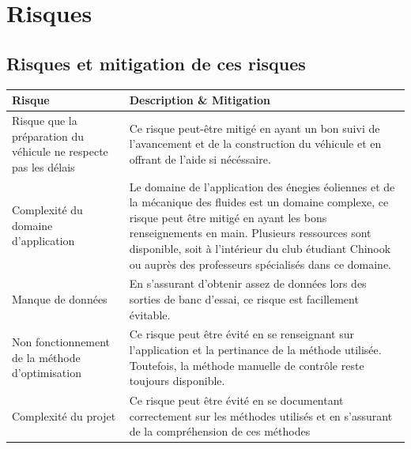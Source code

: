 \documentclass[11pt]{article}
\begin{document}
\section{Risques}

\subsection{Risques et mitigation de ces risques}

\begin{table}[H]
  \begin{center}
\begin{tabu} to \linewidth {X[1.5,l]|X[3,l]}
  Risque & Description \& Mitigation \\ \hline
  Risque que la préparation du véhicule ne respecte pas les délais & Ce risque peut-être mitigé en ayant un bon suivi de l'avancement et de la construction du véhicule et en offrant de l'aide si nécéssaire. \\ \hline
  Complexité du domaine d'application & Le domaine de l'application des énegies éoliennes et de la mécanique des fluides est un domaine complexe, ce risque peut être mitigé en ayant les bons renseignements en main. Plusieurs ressources sont disponible, soit à l'intérieur du club étudiant Chinook ou auprès des professeurs spécialisés dans ce domaine.\\ \hline
  Manque de données & En s'assurant d'obtenir assez de données lors des sorties de banc d'essai, ce risque est facillement évitable.\\ \hline
  Non fonctionnement de la méthode d'optimisation & Ce risque peut être évité en se renseignant sur l'application et la pertinance de la méthode utilisée. Toutefois, la méthode manuelle de contrôle reste toujours disponible.\\ \hline
  Complexité du projet & Ce risque peut être évité en se documentant correctement sur les méthodes utilisés et en s'assurant de la compréhension de ces méthodes \\
\end{tabu}
  \end{center}
\end{table}
\end{document}
